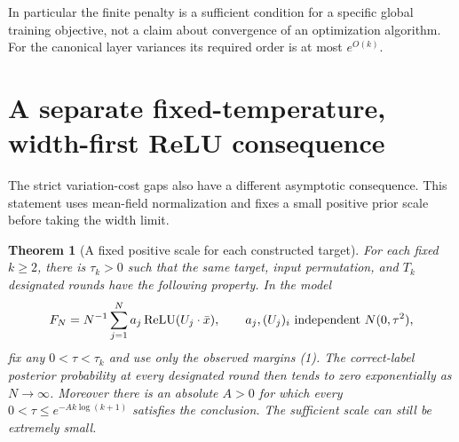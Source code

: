\documentclass[11pt]{article}
\newtheorem{theorem}{Theorem}\newtheorem{lemma}[theorem]{Lemma}
\begin{document}
In particular the finite penalty is a sufficient condition for a
specific global training objective, not a claim about convergence of
an optimization algorithm. For the canonical layer variances its
required order is at most $e^{O(k)}$.

\section{A separate fixed-temperature, width-first ReLU consequence}
The strict variation-cost gaps also have a different asymptotic
consequence. This statement uses mean-field normalization and fixes a
small positive prior scale before taking the width limit.

\begin{theorem}[A fixed positive scale for each constructed target]
For each fixed $k\ge2$, there is $\tau_k>0$ such that the same target,
input permutation, and $T_k$ designated rounds have the following
property. In the model
\[
 F_N=N^{-1}\sum_{j=1}^N a_j\operatorname{ReLU}(U_j\cdot\bar x),
 \qquad a_j,(U_j)_i\ \text{independent }N(0,\tau^2),
\]
fix any $0<\tau<\tau_k$ and use only the observed margins (1).
The correct-label posterior probability at every designated round
then tends to zero exponentially as $N\to\infty$.
Moreover there is an absolute $A>0$ for which every
$0<\tau\le e^{-A k\log(k+1)}$ satisfies the conclusion.
The sufficient scale can still be extremely small.
\end{theorem}
\end{document}
